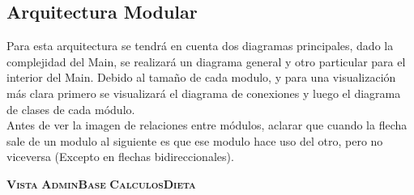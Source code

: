 \subsection{Arquitectura Modular}
Para esta arquitectura se tendrá en cuenta dos diagramas principales, dado la complejidad del Main, se realizará un diagrama general y otro particular para el interior del Main. Debido al tamaño de cada modulo, y para una visualización más clara primero se visualizará el diagrama de conexiones y luego el diagrama de clases de cada módulo.\\
Antes de ver la imagen de relaciones entre módulos, aclarar que cuando la flecha sale de un modulo al siguiente es que ese modulo hace uso del otro, pero no viceversa (Excepto en flechas bidireccionales).


\textbf{\textsc{Vista}}
\textbf{\textsc{AdminBase}}
\textbf{\textsc{CalculosDieta}}
